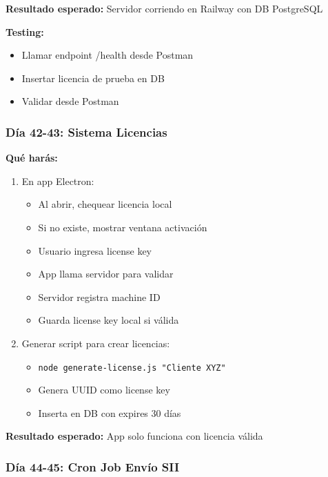 \documentclass[11pt,a4paper]{article}
\begin{document}
\textbf{Resultado esperado:} Servidor corriendo en Railway con DB PostgreSQL

\textbf{Testing:}
\begin{itemize}
    \item Llamar endpoint /health desde Postman
    \item Insertar licencia de prueba en DB
    \item Validar desde Postman
\end{itemize}

\subsubsection{Día 42-43: Sistema Licencias}

\textbf{Qué harás:}
\begin{enumerate}
    \item En app Electron:
    \begin{itemize}
        \item Al abrir, chequear licencia local
        \item Si no existe, mostrar ventana activación
        \item Usuario ingresa license key
        \item App llama servidor para validar
        \item Servidor registra machine ID
        \item Guarda license key local si válida
    \end{itemize}
    \item Generar script para crear licencias:
    \begin{itemize}
        \item \texttt{node generate-license.js "Cliente XYZ"}
        \item Genera UUID como license key
        \item Inserta en DB con expires 30 días
    \end{itemize}
\end{enumerate}

\textbf{Resultado esperado:} App solo funciona con licencia válida

\subsubsection{Día 44-45: Cron Job Envío SII}
\end{document}
